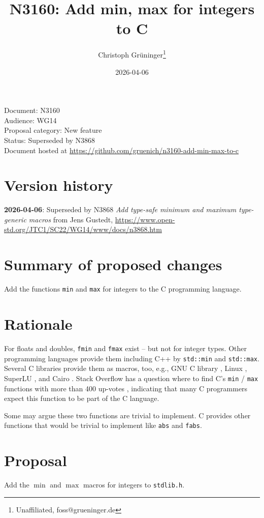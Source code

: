 \documentclass[a4paper,10pt]{scrartcl}
\title{N3160: Add min, max for integers to C}
\author{Christoph Grüninger\footnote{Unaffiliated, foss@grueninger.de}}
\date{2026-04-06}
\begin{document}
\lstset{language=C,basicstyle=\ttfamily}

\maketitle

\noindent
Document: N3160\\
Audience: WG14\\
Proposal category: New feature\\
Status: Superseded by N3868\\
Document hosted at \url{https://github.com/gruenich/n3160-add-min-max-to-c}

\section*{Version history}
\textbf{2026-04-06}: Superseded by N3868 \textit{Add type-safe minimum and maximum type-gen\-eric macros} from Jens Gustedt,
\url{https://www.open-std.org/JTC1/SC22/WG14/www/docs/n3868.htm}

\section{Summary of proposed changes}

Add the functions \lstinline{min} and \lstinline{max} for integers to the C programming language.

\section{Rationale}

For floats and doubles, \lstinline{fmin} and \lstinline{fmax} exist -- but not for integer types. Other
programming languages provide them including C++ by \lstinline{std::min} and \lstinline{std::max}. Several
C libraries provide them as macros, too, e.g., GNU C library \cite{GLibc}, Linux \cite{Linux},
SuperLU \cite{SuperLU}, and Cairo \cite{Cairo}.
Stack Overflow has a question where to find C's \lstinline{min} / \lstinline{max} functions with more
than 400 up-votes \cite{Stackoverflow}, indicating that many C programmers expect this function to be
part of the C language.

Some may argue these two functions are trivial to implement. C provides other functions that would be
trivial to implement like \lstinline{abs} and \lstinline{fabs}.

\section{Proposal}
Add the $\operatorname{min}$ and $\operatorname{max}$ macros for integers to \lstinline{stdlib.h}.
\end{document}
